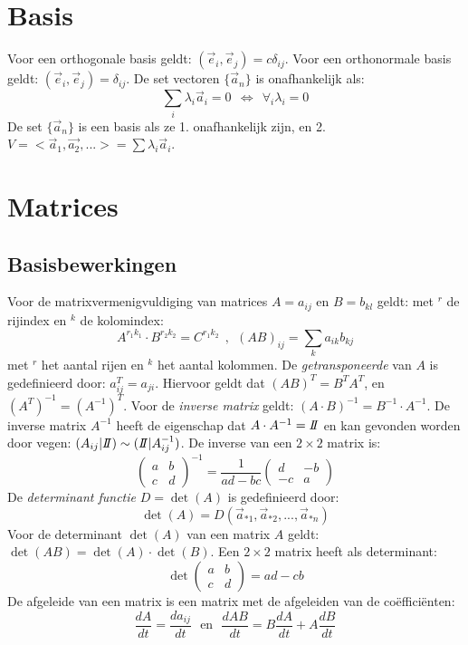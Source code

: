 \documentclass[twoside]{report}
\begin{document}
\section{Basis}
Voor een orthogonale basis geldt: $(\vec{e}_i,\vec{e}_j)=c\delta_{ij}$. Voor
een orthonormale basis geldt: $(\vec{e}_i,\vec{e}_j)=\delta_{ij}$.
\npar
De set vectoren $\{\vec{a}_n\}$ is onafhankelijk als:
\[
\sum\limits_i\lambda_i\vec{a}_i=0~~\Leftrightarrow~~\forall_i\lambda_i=0
\]
De set $\{\vec{a}_n\}$ is een basis als ze 1. onafhankelijk zijn, en 2.
$V=<\vec{a}_1,\vec{a_2},...>=\sum\lambda_i\vec{a}_i$.

\section{Matrices}
\subsection{Basisbewerkingen}
Voor de matrixvermenigvuldiging van matrices $A=a_{ij}$ en $B=b_{kl}$ geldt:
met $^r$ de rijindex en $^k$ de kolomindex:
\[
A^{r_1k_1}\cdot B^{r_2k_2}=C^{r_1k_2}~~,~~(AB)_{ij}=\sum_ka_{ik}b_{kj}
\]
met $^r$ het aantal rijen en $^k$ het aantal kolommen.
\npar
De {\it getransponeerde} van $A$ is gedefinieerd door: $a_{ij}^T=a_{ji}$.
Hiervoor geldt dat $(AB)^T=B^TA^T$, en $(A^T)^{-1}=(A^{-1})^T$. Voor de
{\it inverse matrix} geldt: $(A\cdot B)^{-1}=B^{-1}\cdot A^{-1}$. De inverse
matrix $A^{-1}$ heeft de eigenschap dat $A\cdot A^{-1}=I\hspace{-1mm}I$ en kan gevonden
worden door vegen: $(A_{ij}|I\hspace{-1mm}I)\sim(I\hspace{-1mm}I|A_{ij}^{-1})$.
\npar
De inverse van een $2\times2$ matrix is:
\[
\left(\begin{array}{cc}a&b\\ c&d\end{array}\right)^{-1}=\frac{1}{ad-bc}
\left(\begin{array}{cc}d&-b\\ -c&a\end{array}\right)
\]
\npar
De {\it determinant functie} $D=\det(A)$ is gedefinieerd door:
\[
\det(A)=D(\vec{a}_{*1},\vec{a}_{*2},...,\vec{a}_{*n})
\]
Voor de determinant $\det(A)$ van een matrix $A$ geldt:
$\det(AB)=\det(A)\cdot\det(B)$. Een $2\times2$ matrix heeft als determinant:
\[
\det\left(\begin{array}{cc}a&b\\ c&d \end{array}\right)=ad-cb
\]
De afgeleide van een matrix is een matrix met de afgeleiden van de co\"effici\"enten:
\[
\frac{dA}{dt}=\frac{da_{ij}}{dt}~~~\mbox{en}~~~\frac{dAB}{dt}=B\frac{dA}{dt}+A\frac{dB}{dt}
\]
\end{document}
